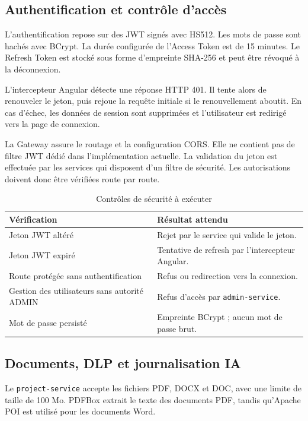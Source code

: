 \subsection{Authentification et contrôle d'accès}

L'authentification repose sur des JWT signés avec HS512. Les mots de passe sont hachés avec BCrypt. La durée configurée de l'Access Token est de 15 minutes. Le Refresh Token est stocké sous forme d'empreinte SHA-256 et peut être révoqué à la déconnexion.

L'intercepteur Angular détecte une réponse HTTP 401. Il tente alors de renouveler le jeton, puis rejoue la requête initiale si le renouvellement aboutit. En cas d'échec, les données de session sont supprimées et l'utilisateur est redirigé vers la page de connexion.

La Gateway assure le routage et la configuration CORS. Elle ne contient pas de filtre JWT dédié dans l'implémentation actuelle. La validation du jeton est effectuée par les services qui disposent d'un filtre de sécurité. Les autorisations doivent donc être vérifiées route par route.

\begin{table}[H]
\centering
\caption{Contrôles de sécurité à exécuter}
\label{tab:controles-securite}
\begin{tabularx}{\textwidth}{p{5.5cm}Y}
\toprule
\textbf{Vérification} & \textbf{Résultat attendu} \\
\midrule
Jeton JWT altéré & Rejet par le service qui valide le jeton. \\
Jeton JWT expiré & Tentative de refresh par l'intercepteur Angular. \\
Route protégée sans authentification & Refus ou redirection vers la connexion. \\
Gestion des utilisateurs sans autorité ADMIN & Refus d'accès par \texttt{admin-service}. \\
Mot de passe persisté & Empreinte BCrypt ; aucun mot de passe brut. \\
\bottomrule
\end{tabularx}
\end{table}

\subsection{Documents, DLP et journalisation IA}

Le \texttt{project-service} accepte les fichiers PDF, DOCX et DOC, avec une limite de taille de 100 Mo. PDFBox extrait le texte des documents PDF, tandis qu'Apache POI est utilisé pour les documents Word.

